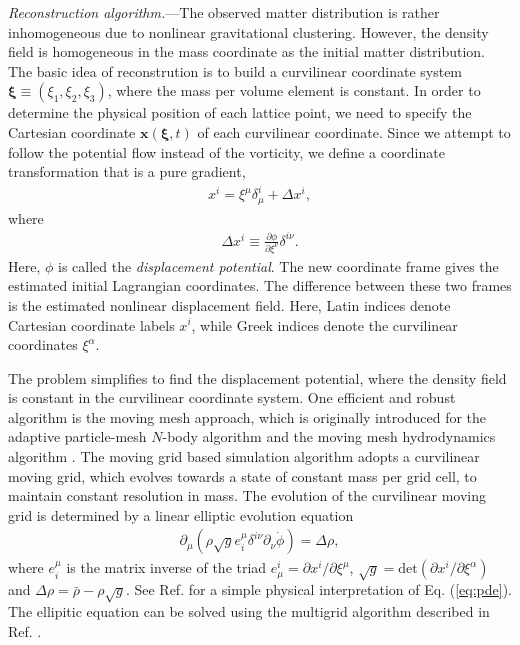 \documentclass[aps,prl,twocolumn,showpacs,superscriptaddress,groupedaddress,nofootinbib]{revtex4}  %
\newcommand{\mr}{\mathrm}
\newcommand{\bea}{\begin{eqnarray}}
\newcommand{\eea}{\end{eqnarray}}
\begin{document}
{\it Reconstruction algorithm.}---The observed matter distribution is rather 
inhomogeneous due to nonlinear gravitational clustering. 
However, the density field is homogeneous in the mass coordinate as
the initial matter distribution.
The basic idea of reconstrution is to build a curvilinear 
coordinate system $\bm{\xi}\equiv(\xi_1,\xi_2,\xi_3)$, where the mass per
volume element is constant. 
In order to determine the physical position of each lattice point, we need to 
specify the Cartesian coordinate $\bm{x}(\bm{\xi},t)$ of each curvilinear 
coordinate.
Since we attempt to follow the potential flow instead of the vorticity, we 
define a coordinate transformation that is a pure gradient,
\bea
\label{eq:trs}
x^i=\xi^\mu\delta^i_\mu+\Delta x^i,
\eea
where
\bea
\Delta x^i\equiv\frac{\partial\phi}{\partial\xi^\nu}\delta^{i\nu}.
\eea
Here, $\phi$ is called the {\it displacement potential}. 
The new coordinate frame gives the estimated initial Lagrangian coordinates. 
The difference between these two frames is the estimated nonlinear displacement field.
Here, Latin indices denote Cartesian coordinate labels $x^i$, while Greek 
indices denote the curvilinear coordinates $\xi^\alpha$.

The problem simplifies to find the displacement potential, where the density field
is constant in the curvilinear coordinate system.
One efficient and robust algorithm is the moving mesh approach, which
is originally introduced for the adaptive particle-mesh $N$-body 
algorithm \cite{1995ApJS..100..269P} and the moving mesh hydrodynamics algorithm
\cite{1998ApJS..115...19P}. 
The moving grid based simulation algorithm adopts a curvilinear moving grid,
which evolves towards a state of constant mass per grid cell, to maintain constant
resolution in mass.
The evolution of the curvilinear moving grid is determined by a linear elliptic
evolution equation
\bea
\label{eq:pde}
\partial_\mu(\rho\sqrt{g}e^\mu_i\delta^{i\nu}\partial_\nu\dot{\phi})=\Delta\rho,
\eea
where $e^\mu_i$ is the matrix inverse of the triad $e^i_\mu=\partial x^i/\partial\xi^\mu$, $\sqrt{g}=\mr{det}(\partial x^i/\partial \xi^\alpha)$ and 
$\Delta\rho=\bar{\rho}-\rho\sqrt{g}$. 
See Ref. \cite{1995ApJS..100..269P} for a simple physical interpretation of 
Eq. (\ref{eq:pde}).
The ellipitic equation can be solved using the multigrid algorithm described 
in Ref. \cite{1995ApJS..100..269P}.
\end{document}
